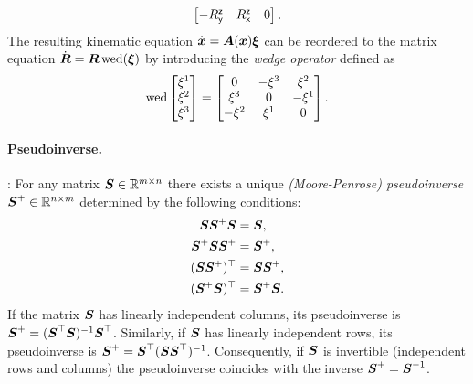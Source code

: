 \begin{Example}
\begin{align}
\begin{bmatrix}
  -R^{\mathsf{z}}_{\mathsf{y}} & R^{\mathsf{z}}_{\mathsf{x}} & 0
 \end{bmatrix}.
\end{align}
The resulting kinematic equation $\dot{\boldsymbol{x}} = \boldsymbol{A}(\boldsymbol{x}) \boldsymbol{\xi}$ can be reordered to the matrix equation $\dot{\boldsymbol{R}} = \boldsymbol{R} \operatorname{wed}(\boldsymbol{\xi})$ by introducing the \textit{wedge operator} defined as
\begin{align}
 \operatorname{wed} \begin{bmatrix} \xi^{1} \\ \xi^{2} \\ \xi^{3} \end{bmatrix} = \begin{bmatrix} 0 & -\xi^{3} & \xi^{2} \\ \xi^{3} & 0 & -\xi^{1} \\ -\xi^{2} & \xi^{1} & 0 \end{bmatrix}.
\end{align}
\end{Example}

\paragraph{Pseudoinverse.}
\cite[Theo.\ 1]{Penrose:Pseudoinverse}:
For any matrix $\boldsymbol{S}\in\mathbb{R}^{m\times n}$ there exists a unique \textit{(Moore-Penrose) pseudoinverse} $\boldsymbol{S}^+ \in \mathbb{R}^{n\times m}$ determined by the following conditions:
\begin{subequations}\label{eq:PenroseConditions}
\begin{align}
 \boldsymbol{S} \boldsymbol{S}^+ \boldsymbol{S} &= \boldsymbol{S},
\\
 \boldsymbol{S}^+ \boldsymbol{S} \boldsymbol{S}^+ &= \boldsymbol{S}^+,
\\
 (\boldsymbol{S} \boldsymbol{S}^+)^\top &= \boldsymbol{S} \boldsymbol{S}^+,
\\
 (\boldsymbol{S}^+ \boldsymbol{S})^\top &= \boldsymbol{S}^+ \boldsymbol{S}.
\end{align}
\end{subequations}
If the matrix $\boldsymbol{S}$ has linearly independent columns, its pseudoinverse is $\boldsymbol{S}^+ = (\boldsymbol{S}^\top \boldsymbol{S})^{-1} \boldsymbol{S}^\top$.
Similarly, if $\boldsymbol{S}$ has linearly independent rows, its pseudoinverse is $\boldsymbol{S}^+ = \boldsymbol{S}^\top (\boldsymbol{S} \boldsymbol{S}^\top)^{-1}$.
Consequently, if $\boldsymbol{S}$ is invertible (independent rows and columns) the pseudoinverse coincides with the inverse $\boldsymbol{S}^+ = \boldsymbol{S}^{-1}$.

